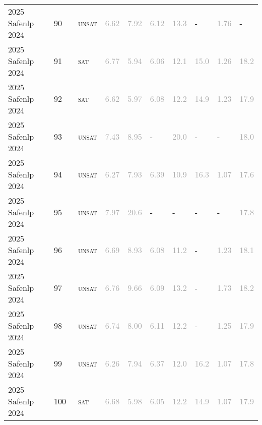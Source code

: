 \begin{center}
{\begin{longtable}{@{}llllllllll@{}}
2025 Safenlp 2024 & 90 & ~\textsc{unsat} & \textcolor{darkgray}{6.62} & \textcolor{darkgray}{7.92} & \textcolor{darkgray}{6.12} & \textcolor{darkgray}{13.3} & - & \textcolor{darkgray}{1.76} & - \\
2025 Safenlp 2024 & 91 & ~\textsc{sat} & \textcolor{darkgray}{6.77} & \textcolor{darkgray}{5.94} & \textcolor{darkgray}{6.06} & \textcolor{darkgray}{12.1} & \textcolor{darkgray}{15.0} & \textcolor{darkgray}{1.26} & \textcolor{darkgray}{18.2} \\
2025 Safenlp 2024 & 92 & ~\textsc{sat} & \textcolor{darkgray}{6.62} & \textcolor{darkgray}{5.97} & \textcolor{darkgray}{6.08} & \textcolor{darkgray}{12.2} & \textcolor{darkgray}{14.9} & \textcolor{darkgray}{1.23} & \textcolor{darkgray}{17.9} \\
2025 Safenlp 2024 & 93 & ~\textsc{unsat} & \textcolor{darkgray}{7.43} & \textcolor{darkgray}{8.95} & - & \textcolor{darkgray}{20.0} & - & - & \textcolor{darkgray}{18.0} \\
2025 Safenlp 2024 & 94 & ~\textsc{unsat} & \textcolor{darkgray}{6.27} & \textcolor{darkgray}{7.93} & \textcolor{darkgray}{6.39} & \textcolor{darkgray}{10.9} & \textcolor{darkgray}{16.3} & \textcolor{darkgray}{1.07} & \textcolor{darkgray}{17.6} \\
2025 Safenlp 2024 & 95 & ~\textsc{unsat} & \textcolor{darkgray}{7.97} & \textcolor{darkgray}{20.6} & - & - & - & - & \textcolor{darkgray}{17.8} \\
2025 Safenlp 2024 & 96 & ~\textsc{unsat} & \textcolor{darkgray}{6.69} & \textcolor{darkgray}{8.93} & \textcolor{darkgray}{6.08} & \textcolor{darkgray}{11.2} & - & \textcolor{darkgray}{1.23} & \textcolor{darkgray}{18.1} \\
2025 Safenlp 2024 & 97 & ~\textsc{unsat} & \textcolor{darkgray}{6.76} & \textcolor{darkgray}{9.66} & \textcolor{darkgray}{6.09} & \textcolor{darkgray}{13.2} & - & \textcolor{darkgray}{1.73} & \textcolor{darkgray}{18.2} \\
2025 Safenlp 2024 & 98 & ~\textsc{unsat} & \textcolor{darkgray}{6.74} & \textcolor{darkgray}{8.00} & \textcolor{darkgray}{6.11} & \textcolor{darkgray}{12.2} & - & \textcolor{darkgray}{1.25} & \textcolor{darkgray}{17.9} \\
2025 Safenlp 2024 & 99 & ~\textsc{unsat} & \textcolor{darkgray}{6.26} & \textcolor{darkgray}{7.94} & \textcolor{darkgray}{6.37} & \textcolor{darkgray}{12.0} & \textcolor{darkgray}{16.2} & \textcolor{darkgray}{1.07} & \textcolor{darkgray}{17.8} \\
2025 Safenlp 2024 & 100 & ~\textsc{sat} & \textcolor{darkgray}{6.68} & \textcolor{darkgray}{5.98} & \textcolor{darkgray}{6.05} & \textcolor{darkgray}{12.2} & \textcolor{darkgray}{14.9} & \textcolor{darkgray}{1.07} & \textcolor{darkgray}{17.9} \\

\end{longtable}}
\end{center}
